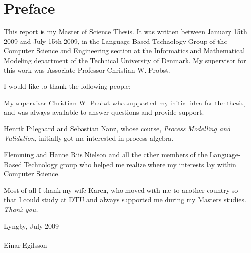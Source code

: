 \chapter{Preface}
	This report is my Master of Science Thesis. It was written between January 
	15th 2009 and July 15th 2009, in the Language-Based Technology Group of the 
	Computer Science and Engineering section at the Informatics and Mathematical 
	Modeling department of the Technical University of Denmark. My supervisor 
	for this work was Associate Professor Christian W. Probst.

	I would like to thank the following people:

	My supervisor Christian W. Probst who supported my initial idea for the 
	thesis, and was always available to answer questions and provide support.
	
	Henrik Pilegaard and Sebastian Nanz, whose course, \textit{Process Modelling 
	and Validation}, initially got me interested in process algebra.
	
	Flemming and Hanne Riis Nielson and all the other members of the 
	Language-Based Technology group who helped me realize where my interests lay 
	within Computer Science.
	
	Most of all I thank my wife Karen, who moved with me to another country so 
	that I could study at DTU and always supported me during my Masters studies. 
	\textit{Thank you.}

	\vspace{10mm}
	\mbox{}\hfill
	\begin{minipage}[t]{80mm}
  	Lyngby, July 2009
  	\\ \\
  	Einar Egilsson
	\end{minipage}

